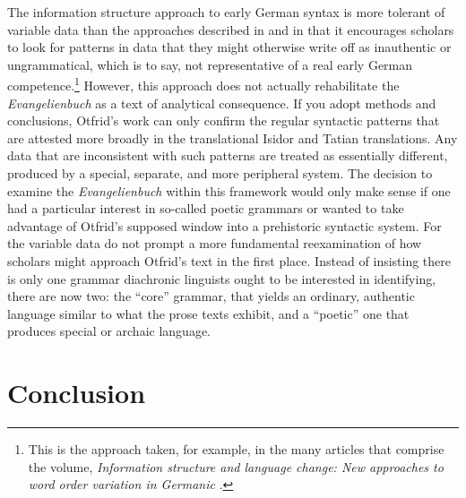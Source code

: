 The information structure approach to early German syntax is more tolerant of variable data than the approaches described in \citet{Fleischer2006} and \citet{Robinson1997} in that it encourages scholars to look for patterns in data that they might otherwise write off as inauthentic or ungrammatical, which is to say, not representative of a real early German competence.\footnote{{This is the approach taken, for example, in the many articles that comprise the volume,} {\textit{Information structure and language change: New approaches to word order variation in Germanic}}{ \citep{Hinterholzl2009}.} } However, this approach does not actually rehabilitate the \textit{Evangelienbuch} as a text of analytical consequence. If you adopt  methods and conclusions, Otfrid’s work can only confirm the regular syntactic patterns that are attested more broadly in the translational Isidor and Tatian translations. Any data that are inconsistent with such patterns are treated as essentially different, produced by a special, separate, and more peripheral system. The decision to examine the \textit{Evangelienbuch} within this framework would only make sense if one had a particular interest in so-called poetic grammars or wanted to take advantage of Otfrid’s supposed window into a prehistoric syntactic system. For \citet{Lötscher2009} the variable data do not prompt a more fundamental reexamination of how scholars might approach Otfrid’s text in the first place. Instead of insisting there is only one grammar diachronic linguists ought to be interested in identifying, there are now two: the “core” grammar, that yields an ordinary, authentic language similar to what the prose texts exhibit, and a “poetic” one that produces special or archaic language.

\section{Conclusion}\label{sec:2.3}

